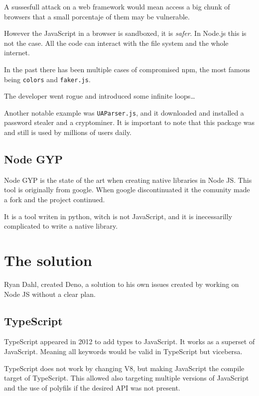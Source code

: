 \documentclass[12pt, letterpaper]{article}
\begin{document}
\begin{multicols}{2}
    A sussesfull attack on a web framework would mean access a big chunk of browsers that a small porcentaje of them may be vulnerable.

    However the JavaScript in a browser is sandboxed, it is \textit{safer}. In Node.js this is not the case. All the code can interact with the file system and the whole internet.

    In the past there has been multiple cases of compromised npm, the most famous being \verb|colors| and \verb|faker.js|.

    The developer went rogue and introduced some infinite loops\dots

    Another notable example was \verb|UAParser.js|, and it downloaded and installed a password stealer and a cryptominer. It is important to note that this package was and still is used by millions of users daily.


    \subsection{Node GYP}

    Node GYP is the state of the art when creating native libraries in Node JS. This tool is originally from google. When google discontinuated it the comunity made a fork and the project continued.

    It is a tool writen in python, witch is not JavaScript, and it is inecessarilly complicated to write a native library.

    \section{The solution}

    Ryan Dahl, created Deno, a solution to his own issues created by working on Node JS without a clear plan.

    \subsection{TypeScript}

    TypeScript appeared in 2012 to add types to JavaScript. It works as a superset of JavaScript. Meaning all keywords would be valid in TypeScript but vicebersa.

    TypeScript does not work by changing V8, but making JavaScript the compile target of TypeScript. This allowed also targeting multiple versions of JavaScript and the use of polyfils if the desired API was not present.


\end{multicols}
\end{document}
